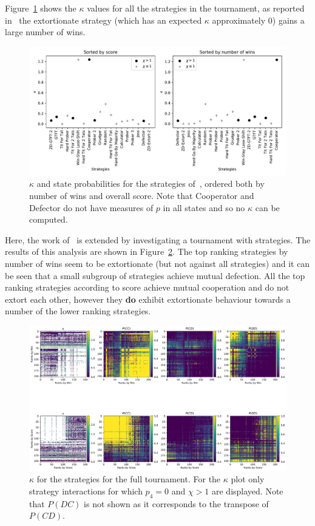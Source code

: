 \documentclass[a4paper]{article}
\begin{document}
Figure~\ref{fig:kappa_overall_in_stewart_plotkin} shows the
\(\kappa\) values for all the strategies in the tournament, as
reported in~\cite{Stewart2012} the extortionate strategy (which has an expected
\(\kappa\) approximately 0) gains a large number of wins.

\begin{figure}[!htbp]
    \centering
    \includegraphics[width=.8\textwidth]{./assets/img/kappa_overall_in_stewart_plotkin/main.pdf}
    \caption{\(\kappa\) and state probabilities for the strategies
        of~\cite{Stewart2012}, ordered both by number of wins and overall score.
        Note that Cooperator and Defector do not have measures of \(p\) in all
        states and so no \(\kappa\) can be computed.
        }
    \label{fig:kappa_overall_in_stewart_plotkin}
\end{figure}

Here, the work of~\cite{Stewart2012} is extended by investigating a tournament
with strategies. The
results of this analysis are shown in
Figure~\ref{fig:kappa_and_probabilities_in_full}. The top ranking strategies
by number of wins seem to be extortionate (but not against all strategies) and
it can be seen that a small subgroup of strategies achieve mutual defection.
All the top ranking strategies according to score achieve mutual cooperation and
do not extort each other, however they \textbf{do} exhibit extortionate
behaviour towards a number of the lower ranking strategies.

\begin{figure}[!htbp]
    \centering
    \includegraphics[width=.95\textwidth]{./assets/img/kappa_and_probabilities_in_full/main.pdf}
    \caption{\(\kappa\) for the strategies for the full
        tournament. For the \(\kappa\) plot only strategy
        interactions for which \(p_4=0\) and \(\chi>1\) are displayed. Note that
        \(P(DC)\) is not shown as it corresponds to the transpose of \(P(CD)\).}
    \label{fig:kappa_and_probabilities_in_full}
\end{figure}
\end{document}
